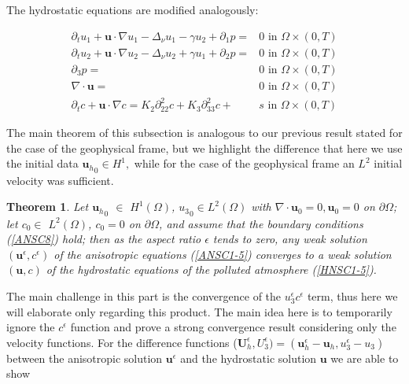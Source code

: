 \documentclass[11pt]{article}
\newtheorem{theorem}{Theorem}
\begin{document}
The hydrostatic equations are modified analogously:

\begin{equation} \label{HNSC1-5}
  \begin{split}
    \partial_t u_1 + \mathbf{u} \cdot \nabla u_1 - \Delta_\nu u_1 -\gamma u_2 + \partial_1 p = & 0 \text{ in } \Omega \times (0,T) \\
    \partial_t u_2 + \mathbf{u} \cdot \nabla u_2 - \Delta_\nu u_2 + \gamma u_1 + \partial_2 p = & 0 \text{ in } \Omega \times (0,T) \\
    \partial_3 p = & 0 \text{ in } \Omega \times (0,T) \\
    \nabla \cdot \mathbf{u} = & 0 \text{ in } \Omega \times (0,T) \\
    \partial_t c + \mathbf{u} \cdot \nabla c = K_2 \partial_{22} ^ 2 c + K_3 \partial_{33} ^2 c + & s \text{ in } \Omega \times (0,T)
  \end{split}  
\end{equation}

The main theorem of this subsection is analogous to our previous result stated for the case of the geophysical frame, but we highlight the difference that here we use the initial data ${\mathbf{u}_h}_0 \in H^1,$ while for the case of the geophysical frame an $L^2$ initial velocity was sufficient.

\begin{theorem} \label{maintheorem}
  Let ${\mathbf{u}_h}_0$ $\in$ $H^1 (\Omega)$, ${u_3}_0 \in L^2(\Omega)$ with $\nabla \cdot \mathbf{u}_0 = 0, \mathbf{u}_0 = 0$ on $\partial \Omega$; let $c_0 \in$ $L^2 (\Omega)$, $c_0 = 0$ on $ \partial \Omega$, and assume that the boundary conditions (\ref{ANSC8}) hold; then as the aspect ratio $\epsilon$ tends to zero, any weak solution $(\mathbf{u}^\epsilon, c^\epsilon)$ of the anisotropic equations (\ref{ANSC1-5}) converges to a weak solution $(\mathbf{u}, c)$ of the hydrostatic equations of the polluted atmosphere (\ref{HNSC1-5}).
\end{theorem}

The main challenge in this part is the convergence of the $u_3^\epsilon c^\epsilon$ term, thus here we will elaborate only regarding this product. The main idea here is to temporarily ignore the $c^\epsilon$ function and prove a strong convergence result considering only the velocity functions. For the difference functions ($\mathbf{U}_h^\epsilon, U_3^\epsilon) = (\mathbf{u}_h^\epsilon - \mathbf{u}_h, u_3^\epsilon - u_3)$ between the anisotropic solution $\mathbf{u}^\epsilon$ and the hydrostatic solution $\mathbf{u}$ we are able to show
\end{document}

